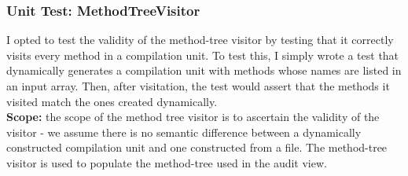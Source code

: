 \documentclass[9pt]{article}
\begin{document}
		\subsubsection{Unit Test: MethodTreeVisitor}

			I opted to test the validity of the method-tree visitor by testing
			that it correctly visits every method in a compilation unit. To test
			this, I simply wrote a test that dynamically generates a compilation
			unit with methods whose names are listed in an input array. Then,
			after visitation, the test would assert that the methods it visited
			match the ones created dynamically.\\

			\textbf{Scope:} the scope of the method tree visitor is to ascertain
			the validity of the visitor - we assume there is no semantic
			difference between a dynamically constructed compilation unit and
			one constructed from a file. The method-tree visitor is used to
			populate the method-tree used in the audit view.
\end{document}
